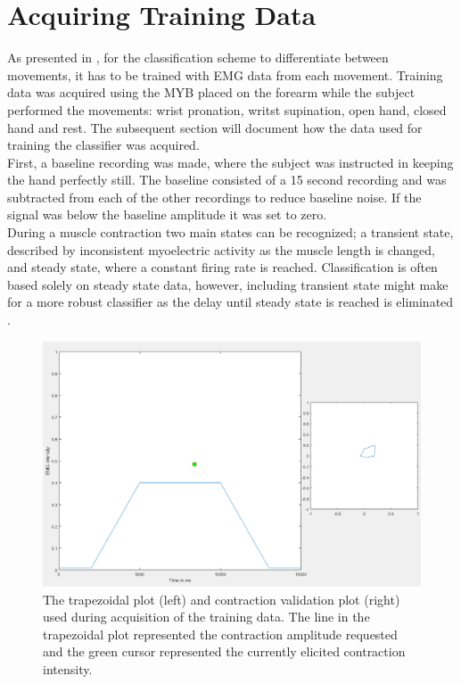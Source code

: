 
\section{Acquiring Training Data}

As presented in , for the classification scheme to differentiate between movements, it has to be trained with EMG data from each movement. Training data was acquired using the MYB placed on the forearm while the subject performed the movements: wrist pronation, writst supination, open hand, closed hand and rest. The subsequent section will document how the data used for training the classifier was acquired. \\
First, a baseline recording was made, where the subject was instructed in keeping the hand perfectly still. The baseline consisted of a 15 second recording and was subtracted from each of the other recordings to reduce baseline noise. If the signal was below the baseline amplitude it was set to zero. \\
During a muscle contraction two main states can be recognized; a transient state, described by inconsistent myoelectric activity as the muscle length is changed, and steady state, where a constant firing rate is reached. \cite{Mobarak2014} Classification is often based solely on steady state data, however, including transient state might make for a more robust classifier as the delay until steady state is reached is eliminated \cite{Boschmann2013,Mobarak2014a}. \\
%

\begin{figure}[H]                 
	\includegraphics[width=.8\textwidth]{figures/dataacqGUI}  
	\caption{The trapezoidal plot (left) and contraction validation plot (right) used during acquisition of the training data. The line in the trapezoidal plot represented the contraction amplitude requested and the green cursor represented the currently elicited contraction intensity. }
	\label{fig:GUI} 
\end{figure}
\vspace{-1em}

